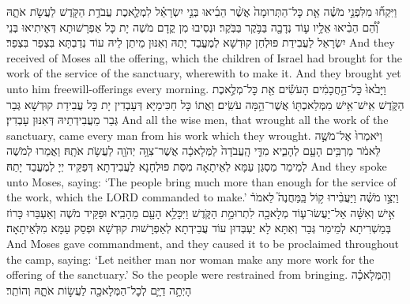 {%
{וַיִּקְח֞וּ מִלִּפְנֵ֣י מֹשֶׁ֗ה אֵ֤ת כׇּל־הַתְּרוּמָה֙ אֲשֶׁ֨ר הֵבִ֜יאוּ בְּנֵ֣י יִשְׂרָאֵ֗ל לִמְלֶ֛אכֶת עֲבֹדַ֥ת הַקֹּ֖דֶשׁ לַעֲשֹׂ֣ת אֹתָ֑הּ וְ֠הֵ֠ם הֵבִ֨יאוּ אֵלָ֥יו ע֛וֹד נְדָבָ֖ה בַּבֹּ֥קֶר בַּבֹּֽקֶר׃}
{וּנְסִיבוּ מִן קֳדָם מֹשֶׁה יָת כָּל אַפְרָשׁוּתָא דְּאֵיתִיאוּ בְּנֵי יִשְׂרָאֵל לַעֲבִידַת פּוּלְחַן קוּדְשָׁא לְמֶעֱבַד יָתַהּ וְאִנּוּן מֵיתַן לֵיהּ עוֹד נְדַבְתָּא בִּצְפַר בִּצְפַר׃}
{And they received of Moses all the offering, which the children of Israel had brought for the work of the service of the sanctuary, wherewith to make it. And they brought yet unto him freewill-offerings every morning.}{}
{וַיָּבֹ֙אוּ֙ כׇּל־הַ֣חֲכָמִ֔ים הָעֹשִׂ֕ים אֵ֖ת כׇּל־מְלֶ֣אכֶת הַקֹּ֑דֶשׁ אִֽישׁ־אִ֥ישׁ מִמְּלַאכְתּ֖וֹ אֲשֶׁר־הֵ֥מָּה עֹשִֽׂים׃}
{וַאֲתוֹ כָּל חַכִּימַיָּא דְּעָבְדִין יָת כָּל עֲבִידַת קוּדְשָׁא גְּבַר גְּבַר מֵעֲבִידְתֵיהּ דְּאִנּוּן עָבְדִין׃}
{And all the wise men, that wrought all the work of the sanctuary, came every man from his work which they wrought.}{}
{וַיֹּאמְרוּ֙ אֶל־מֹשֶׁ֣ה לֵּאמֹ֔ר מַרְבִּ֥ים הָעָ֖ם לְהָבִ֑יא מִדֵּ֤י הָֽעֲבֹדָה֙ לַמְּלָאכָ֔ה אֲשֶׁר־צִוָּ֥ה יְהֹוָ֖ה לַעֲשֹׂ֥ת אֹתָֽהּ׃
}
{וַאֲמַרוּ לְמֹשֶׁה לְמֵימַר מַסְגַּן עַמָּא לְאֵיתָאָה מִסַּת פּוּלְחָנָא לַעֲבִידְתָא דְּפַקֵּיד יְיָ לְמֶעֱבַד יָתַהּ׃}
{And they spoke unto Moses, saying: ‘The people bring much more than enough for the service of the work, which the LORD commanded to make.’}{}
{וַיְצַ֣ו מֹשֶׁ֗ה וַיַּעֲבִ֨ירוּ ק֥וֹל בַּֽמַּחֲנֶה֮ לֵאמֹר֒ אִ֣ישׁ וְאִשָּׁ֗ה אַל־יַעֲשׂוּ־ע֛וֹד מְלָאכָ֖ה לִתְרוּמַ֣ת הַקֹּ֑דֶשׁ וַיִּכָּלֵ֥א הָעָ֖ם מֵהָבִֽיא׃
}
{וּפַקֵּיד מֹשֶׁה וְאַעְבַּרוּ כָּרוֹז בְּמַשְׁרִיתָא לְמֵימַר גְּבַר וְאִתָּא לָא יַעְבְּדוּן עוֹד עֲבִידְתָא לְאַפְרָשׁוּת קוּדְשָׁא וּפְסַק עַמָּא מִלְּאֵיתָאָה׃}
{And Moses gave commandment, and they caused it to be proclaimed throughout the camp, saying: ‘Let neither man nor woman make any more work for the offering of the sanctuary.’ So the people were restrained from bringing.}{}
{וְהַמְּלָאכָ֗ה הָיְתָ֥ה דַיָּ֛ם לְכׇל־הַמְּלָאכָ֖ה לַעֲשׂ֣וֹת אֹתָ֑הּ וְהוֹתֵֽר׃ \setuma         
}
}
